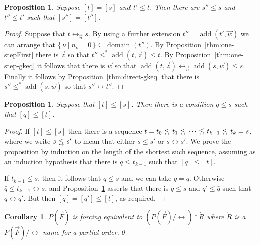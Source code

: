 \documentclass[
twoside,
]{article}
\newtheorem{proposition}[theorem]{Proposition}
\newtheorem{corollary}[theorem]{Corollary}
\theoremstyle{definition}
\theoremstyle{remark}
\DeclareMathOperator{\add}{add}
\newcommand\gkeq{\leftrightarrow}
\newcommand\mgkeq{/{\gkeq}}
\newcommand{\set}[1]{\{\,#1\,\}}
\DeclareMathOperator{\domain}{domain}
\begin{document}
\begin{proposition}
  \label{thm:leq_trans1}
  Suppose $[t]= [s]$ and $t'\leq t$.  Then there are $s''\leq s$ and
  $t''\leq t'$ such that $[s'']=[t'']$.
\end{proposition}
\begin{proof}
  Suppose that $t\gkeq_{\vec n}s$.   By using a
  further extension $t''=\add(t',\vec w)$ we can arrange that
  $\set{\nu\mid n_{\nu}=0}\subseteq\domain(t'')$.  By
  Proposition~\ref{thm:one-stepFirst} there is $\vec z$ so that
  $t''\leq^* \add(t,\vec z)\leq t$.  By
  Proposition~\ref{thm:one-step-gkeq} it follows that there is $\vec
  w$ so that $\add(t,\vec z)\gkeq_{\vec n}\add(s,\vec w)\leq s$.  Finally it   follows by Proposition~\ref{thm:direct-gkeq} that there is
  $s''\leq^* \add(s,\vec w)$ so that $s''\gkeq t''$.
\end{proof}
\begin{proposition}\label{thm:equivnormal}
  Suppose that $[t]\leq [s]$.  Then there is a condition $q\leq s$
  such that $[q]\leq [t]$.
\end{proposition}
\begin{proof}
  \newcommand{\ltgkeq}{\mathbin{\genfrac{}{}{0pt}{}{\raisebox{-3pt}{$<$}}{\raisebox{1pt}{$\scriptstyle\gkeq$}}}}
  If $[t]\leq[s]$ then there is a sequence 
  $t=t_0\ltgkeq t_1\ltgkeq\cdots\ltgkeq t_{k-1}\ltgkeq t_{k}=s$, 
  where we write $s\ltgkeq s'$ to mean that  either $s\le s'$  or $s\gkeq s'$.
  We prove the
  proposition by induction on the length of the shortest such
  sequence, assuming as an induction hypothesis that there is $\bar
  q\le t_{k-1}$ such that $[\bar q]\leq[t]$.
  
  If $t_{k-1}\leq s$, then it follows that  $\bar q\leq s$ and we
  can take $q=\bar q$.   Otherwise $\bar q\le t_{k-1}\gkeq s$, and
  Proposition~\ref{thm:leq_trans1} asserts that there is $q\leq s$
  and $q'\le\bar q$ such that $q\gkeq q'$.  But then $[q]=[q']\leq
  [t]$, as required.
\end{proof}




\begin{corollary}\label{thm:iterated}
  $P(\vec F)$ is forcing equivalent to $(P(\vec F)\mgkeq)*\dot R$ where 
  $\dot R$ is a $P(\vec F)\mgkeq$-name  for a partial order.\qed
\end{corollary}
\end{document}
